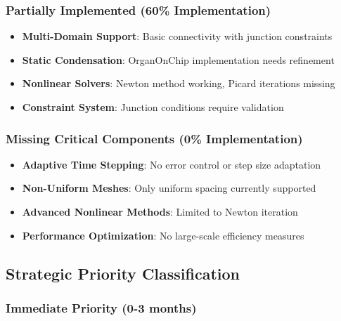 \subsubsection{Partially Implemented (60\% Implementation)}
\begin{itemize}
    \item \textbf{Multi-Domain Support}: Basic connectivity with junction constraints
    \item \textbf{Static Condensation}: OrganOnChip implementation needs refinement
    \item \textbf{Nonlinear Solvers}: Newton method working, Picard iterations missing
    \item \textbf{Constraint System}: Junction conditions require validation
\end{itemize}

\subsubsection{Missing Critical Components (0\% Implementation)}
\begin{itemize}
    \item \textbf{Adaptive Time Stepping}: No error control or step size adaptation
    \item \textbf{Non-Uniform Meshes}: Only uniform spacing currently supported
    \item \textbf{Advanced Nonlinear Methods}: Limited to Newton iteration
    \item \textbf{Performance Optimization}: No large-scale efficiency measures
\end{itemize}

\subsection{Strategic Priority Classification}

\subsubsection{Immediate Priority (0-3 months)}

